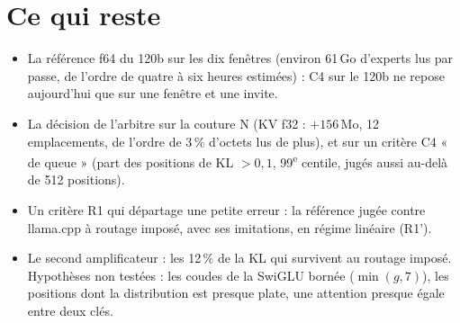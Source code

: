 \section{Ce qui reste}\label{sec:t2r-reste}

\begin{itemize}
\item La référence f64 du 120b sur les dix fenêtres (environ 61\,Go d'experts lus par passe, de l'ordre de quatre à six heures estimées) : C4 sur le 120b ne repose aujourd'hui que sur une fenêtre et une invite.
\item La décision de l'arbitre sur la couture N (KV f32 : $+156$\,Mo, 12 emplacements, de l'ordre de 3\,\% d'octets lus de plus), et sur un critère C4 « de queue » (part des positions de KL $> 0{,}1$, 99\textsuperscript{e} centile, jugés aussi au-delà de 512 positions).
\item Un critère R1 qui départage une petite erreur : la référence jugée contre llama.cpp à routage imposé, avec ses imitations, en régime linéaire (R1').
\item Le second amplificateur : les 12\,\% de la KL qui survivent au routage imposé. Hypothèses non testées : les coudes de la SwiGLU bornée ($\min(g, 7)$), les positions dont la distribution est presque plate, une attention presque égale entre deux clés.
\end{itemize}

